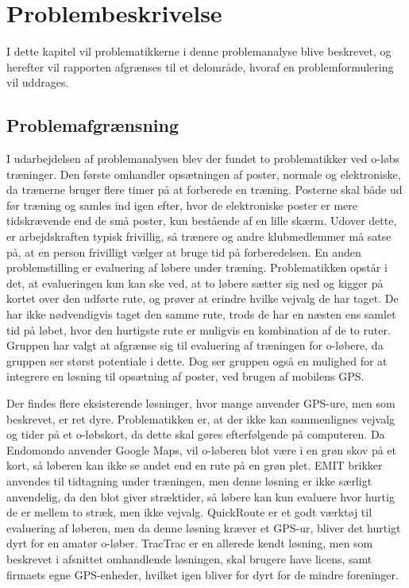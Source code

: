 \chapter{Problembeskrivelse}
I dette kapitel vil problematikkerne i denne problemanalyse blive beskrevet, og herefter vil rapporten afgrænses til et delområde, hvoraf en problemformulering vil uddrages.

\section{Problemafgrænsning}
I udarbejdelsen af problemanalysen blev der fundet to problematikker ved o-løbs træninger. Den første omhandler opsætningen af poster, normale og elektroniske, da trænerne bruger flere timer på at forberede en træning. Posterne skal både ud før træning og samles ind igen efter, hvor de elektroniske poster er mere tidskrævende end de små poster, kun bestående af en lille skærm. Udover dette, er arbejdskraften typisk frivillig, så trænere og andre klubmedlemmer må satse på, at en person frivilligt vælger at bruge tid på forberedelsen. En anden problemstilling er evaluering af løbere under træning. Problematikken opstår i det, at evalueringen kun kan ske ved, at to løbere sætter sig ned og kigger på kortet over den udførte rute, og prøver at erindre hvilke vejvalg de har taget. De har ikke nødvendigvis taget den samme rute, trods de har en næsten ens samlet tid på løbet, hvor den hurtigste rute er muligvis en kombination af de to ruter. Gruppen har valgt at afgrænse sig til evaluering af træningen for o-løbere, da gruppen ser størst potentiale i dette. Dog ser gruppen også en mulighed for at integrere en løsning til opsætning af poster, ved brugen af mobilens GPS. 

Der findes flere eksisterende løsninger, hvor mange anvender GPS-ure, men som beskrevet, er ret dyre. Problematikken er, at der ikke kan sammenlignes vejvalg og tider på et o-løbskort, da dette skal gøres efterfølgende på computeren. Da Endomondo anvender Google Maps, vil o-løberen blot være i en grøn skov på et kort, så løberen kan ikke se andet end en rute på en grøn plet. EMIT brikker anvendes til tidtagning under træningen, men denne løsning er ikke særligt anvendelig, da den blot giver stræktider, så løbere kan kun evaluere hvor hurtig de er mellem to stræk, men ikke vejvalg. QuickRoute er et godt værktøj til evaluering af løberen, men da denne løsning kræver et GPS-ur, bliver det hurtigt dyrt for en amatør o-løber.
TracTrac er en allerede kendt løsning, men som beskrevet i afsnittet omhandlende løsningen, skal brugere have licens, samt firmaets egne GPS-enheder, hvilket igen bliver for dyrt for de mindre foreninger.

